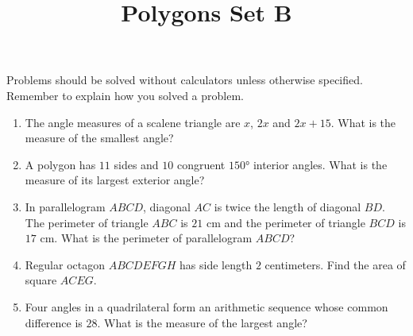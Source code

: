 \documentclass{article}
\title{Polygons Set B}
\author{}
\date{}
\begin{document}
\maketitle
\noindent Problems should be solved without calculators unless otherwise specified.
Remember to explain how you solved a problem.
\begin{multicols}{2}
    \begin{enumerate}
        \item The angle measures of a scalene triangle are $x$, $2x$ and $2x + 15$.
            What is the measure of the smallest angle?
            \vspace{3cm}
        \item A polygon has $11$ sides and $10$ congruent $\ang{150}$ interior angles.
            What is the measure of its largest exterior angle?
            \vspace{3cm}
        \item In parallelogram $ABCD$, diagonal $AC$ is twice the length of diagonal $BD$.
            The perimeter of triangle $ABC$ is $21$ cm and the perimeter of triangle $BCD$ is $17$ cm.
            What is the perimeter of parallelogram $ABCD$?
            \vspace{3cm}
        \item Regular octagon $ABCDEFGH$ has side length $2$ centimeters.
            Find the area of square $ACEG$.
            \vspace{3cm}
        \item Four angles in a quadrilateral form an arithmetic sequence whose common difference is $28$.
            What is the measure of the largest angle?
            \vspace{3cm}
    \end{enumerate}
\end{multicols}
\end{document}
